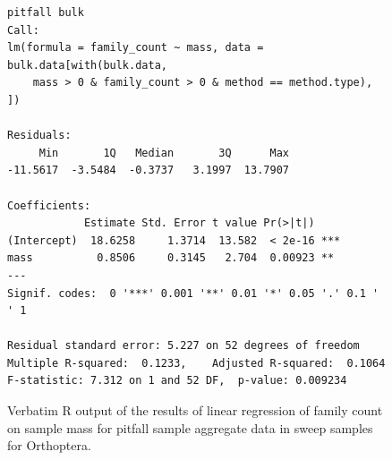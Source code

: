 \documentclass[10pt,letterpaper,twocolumn]{article}
\begin{document}
\begin{figure}[h]
	\lstset{numbers=left}
	\lstset{xleftmargin=5mm,framexleftmargin=5mm}
	\begin{lstlisting}
pitfall bulk
Call:
lm(formula = family_count ~ mass, data = bulk.data[with(bulk.data, 
    mass > 0 & family_count > 0 & method == method.type), ])

Residuals:
     Min       1Q   Median       3Q      Max 
-11.5617  -3.5484  -0.3737   3.1997  13.7907 

Coefficients:
            Estimate Std. Error t value Pr(>|t|)    
(Intercept)  18.6258     1.3714  13.582  < 2e-16 ***
mass          0.8506     0.3145   2.704  0.00923 ** 
---
Signif. codes:  0 '***' 0.001 '**' 0.01 '*' 0.05 '.' 0.1 ' ' 1

Residual standard error: 5.227 on 52 degrees of freedom
Multiple R-squared:  0.1233,	Adjusted R-squared:  0.1064 
F-statistic: 7.312 on 1 and 52 DF,  p-value: 0.009234
	\end{lstlisting}
	\caption{Verbatim R output of the results of linear regression of family count on sample mass for pitfall sample aggregate data in sweep samples for Orthoptera.}
	\label{fig:bulk_pitfall_lm}
	\smallskip
	\nointerlineskip
	\hrulefill
\end{figure}
\end{document}
